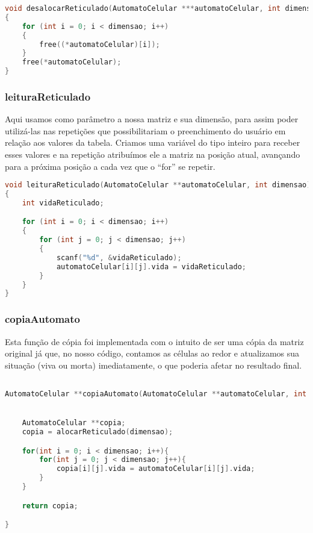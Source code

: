 \documentclass{article}
\begin{document}
\begin{lstlisting}[caption={Função desalocarReticulado},label={lst:cod4},language=C]
void desalocarReticulado(AutomatoCelular ***automatoCelular, int dimensao)
{
    for (int i = 0; i < dimensao; i++)
    {
        free((*automatoCelular)[i]);
    }
    free(*automatoCelular);
}

\end{lstlisting}


\subsubsection{leituraReticulado}

Aqui usamos como parâmetro a nossa matriz e sua dimensão, para assim poder utilizá-las nas repetições que possibilitariam o preenchimento do usuário em relação aos valores da tabela. Criamos uma variável do tipo inteiro para receber esses valores e na repetição atribuímos ele a matriz na posição atual, avançando para a próxima posição a cada vez que o “for” se repetir.

\begin{lstlisting}[caption={Função leituraReticulado},label={lst:cod5},language=C]
void leituraReticulado(AutomatoCelular **automatoCelular, int dimensao)
{
    int vidaReticulado;

    for (int i = 0; i < dimensao; i++)
    {
        for (int j = 0; j < dimensao; j++)
        {
            scanf("%d", &vidaReticulado);
            automatoCelular[i][j].vida = vidaReticulado;
        }
    }
}

\end{lstlisting}

\subsubsection{copiaAutomato}

Esta função de cópia foi implementada com o intuito de ser uma cópia da matriz original já que, no nosso código, contamos as células ao redor e atualizamos sua situação (viva ou morta) imediatamente, o que poderia afetar no resultado final.

\begin{lstlisting}[caption={Função copiaAutomato},label={lst:cod6},language=C]

AutomatoCelular **copiaAutomato(AutomatoCelular **automatoCelular, int dimensao){


    AutomatoCelular **copia;
    copia = alocarReticulado(dimensao);

    for(int i = 0; i < dimensao; i++){
        for(int j = 0; j < dimensao; j++){
            copia[i][j].vida = automatoCelular[i][j].vida; 
        }
    }

    return copia;

}

\end{lstlisting}
\end{document}

